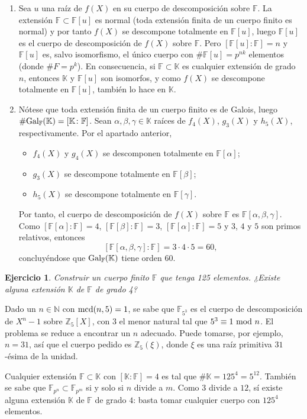 \documentclass[11pt]{report}
\makeatletter
\renewenvironment{proof}[1][\proofname]{\par
  \pushQED{\qed}%
  \normalfont \topsep\z@skip %
  \trivlist
  \item[\hskip\labelsep
        \itshape
    #1\@addpunct{.}]\ignorespaces
}{%
  \popQED\endtrivlist\@endpefalse
}
\newcommand{\N}{\mathbb N}
\newcommand{\Z}{\mathbb Z}
\newcommand{\F}{\mathbb F}
\newcommand{\K}{\mathbb K}
\newtheorem{ejercicio}{Ejercicio}
\makeatother
\begin{document}
\begin{proof}
\hfill
\begin{enumerate}
    \item Sea $u$ una raíz de $f(X)$ en su cuerpo de descomposición sobre $\F$. La extensión $\F \subset \F[u]$ es normal (toda extensión finita de un cuerpo finito es normal) y por tanto $f(X)$ se descompone totalmente en $\F[u]$, luego $\F[u]$ es el cuerpo de descomposición de $f(X)$ sobre $\F$. Pero $[\F[u] \colon \F] = n$ y $\F[u]$ es, salvo isomorfismo, el único cuerpo con $\# \F[u] =p^{nk}$ elementos (donde $\#F=p^k$). En consecuencia, si $\F \subset \K$ es cualquier extensión de grado $n$, entonces $\K$ y $\F[u]$ son isomorfos, y como $f(X)$ se descompone totalmente en $\F[u]$, también lo hace en $\K$.
    \item Nótese que toda extensión finita de un cuerpo finito es de Galois, luego $\#\textup{Gal}_\F(\K) = [\K \colon \F]$. Sean $\alpha, \beta, \gamma \in \K$ raíces de $f_4(X)$, $g_3(X)$ y $h_5(X)$, respectivamente. Por el apartado anterior,
    \begin{itemize}
        \item $f_4(X)$ y $g_4(X)$ se descomponen totalmente en $\F[\alpha]$;
        \item $g_3(X)$ se descompone totalmente en $\F[\beta]$;
        \item $h_5(X)$ se descompone totalmente en $\F[\gamma]$.
    \end{itemize}
    Por tanto, el cuerpo de descomposición de $f(X)$ sobre $\F$ es $\F[\alpha,\beta,\gamma]$.
    Como $[\F[\alpha] \colon \F] = 4$, $[\F[\beta] \colon \F] =3$, $[\F[\alpha] \colon \F] = 5$ y $3$, $4$ y $5$ son primos relativos, entonces \[[\F[\alpha,\beta,\gamma] \colon \F] = 3 \cdot 4 \cdot 5 = 60,\] concluyéndose que $\textup{Gal}_\F(\K)$ tiene orden $60$. \qedhere
\end{enumerate}

\end{proof}

\begin{ejercicio}
    Construir un cuerpo finito $\F$ que tenga 125 elementos. ¿Existe alguna extensión $\K$ de $\F$ de grado 4?
\end{ejercicio}

\begin{proof}
Dado un $n \in \N$ con $\textup{mcd}(n,5)=1$, se sabe que $\F_{5^3}$ es el cuerpo de descomposición de $X^n-1$ sobre $\Z_5[X]$, con $3$ el menor natural tal que $5^3 \equiv 1 \textup{ mod } n$. El problema se reduce a encontrar un $n$ adecuado. Puede tomarse, por ejemplo, $n=31$, así que el cuerpo pedido es $\Z_5(\xi)$, donde $\xi$ es una raíz primitiva $31$-ésima de la unidad.

Cualquier extensión $\F \subset \K$ con $[\K \colon \F]=4$ es tal que $\#\K = 125^4 = 5^{12}$. También se sabe que $\F_{p^n} \subset \F_{p^m}$ si y solo si $n$ divide a $m$. Como $3$ divide a $12$, sí existe alguna extensión $\K$ de $\F$ de grado $4$: basta tomar cualquier cuerpo con $125^4$ elementos.
\end{proof}
\end{document}
